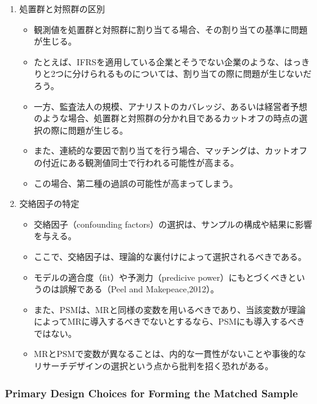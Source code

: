 \begin{enumerate}
 \item 処置群と対照群の区別
   \begin{itemize}
    \item 観測値を処置群と対照群に割り当てる場合、その割り当ての基準に問題が生じる。
    \item たとえば、IFRSを適用している企業とそうでない企業のような、はっきりと2つに分けられるものについては、割り当ての際に問題が生じないだろう。
    \item 一方、監査法人の規模、アナリストのカバレッジ、あるいは経営者予想のような場合、処置群と対照群の分かれ目であるカットオフの時点の選択の際に問題が生じる。
    \item また、連続的な要因で割り当てを行う場合、マッチングは、カットオフの付近にある観測値同士で行われる可能性が高まる。
    \item この場合、第二種の過誤の可能性が高まってしまう。
   \end{itemize}
 \item 交絡因子の特定
   \begin{itemize}
    \item 交絡因子（confounding factors）の選択は、サンプルの構成や結果に影響を与える。
    \item ここで、交絡因子は、理論的な裏付けによって選択されるべきである。
    \item モデルの適合度（fit）や予測力（predicive power）にもとづくべきというのは誤解である（Peel and Makepeace,2012）。
    \item また、PSMは、MRと同様の変数を用いるべきであり、当該変数が理論によってMRに導入するべきでないとするなら、PSMにも導入するべきではない。
    \item MRとPSMで変数が異なることは、内的な一貫性がないことや事後的なリサーチデザインの選択という点から批判を招く恐れがある。
   \end{itemize}
\end{enumerate}

\subsubsection*{Primary Design Choices for Forming the Matched Sample}

